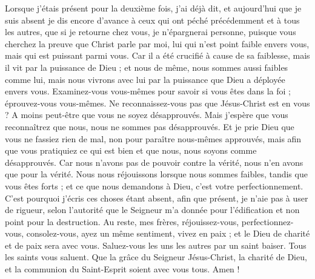 \begin{multicols}{2}
Lorsque j’étais présent pour la deuxième fois, j’ai déjà dit, et aujourd’hui que je suis absent je dis encore d’avance à ceux qui ont péché précédemment et à tous les autres, que si je retourne chez vous, je n'épargnerai personne,
puisque vous cherchez la preuve que Christ parle par moi, lui qui n'est point faible envers vous, mais qui est puissant parmi vous.
Car il a été crucifié à cause de sa faiblesse, mais il vit par la puissance de Dieu ; et nous de même, nous sommes aussi faibles comme lui, mais nous vivrons avec lui par la puissance que Dieu a déployée envers vous.
Examinez-vous vous-mêmes pour savoir si vous êtes dans la foi ; éprouvez-vous vous-mêmes. Ne reconnaissez-vous pas que Jésus-Christ est en vous ? A moins peut-être que vous ne soyez désapprouvés.
Mais j'espère que vous reconnaîtrez que nous, nous ne sommes pas désapprouvés.
Et je prie Dieu que vous ne fassiez rien de mal, non pour paraître nous-mêmes approuvés, mais afin que vous pratiquiez ce qui est bien et que nous, nous soyons comme désapprouvés.
Car nous n’avons pas de pouvoir contre la vérité, nous n’en avons que pour la vérité.
Nous nous réjouissons lorsque nous sommes faibles, tandis que vous êtes forts ; et ce que nous demandons à Dieu, c’est votre perfectionnement.
C'est pourquoi j'écris ces choses étant absent, afin que présent, je n’aie pas à user de rigueur, selon l’autorité que le Seigneur m'a donnée pour l'édification et non point pour la destruction.
\TextTitle{[Conclusion]}
Au reste, mes frères, réjouissez-vous, perfectionnez-vous, consolez-vous, ayez un même sentiment, vivez en paix ; et le Dieu de charité et de paix sera avec vous.
Saluez-vous les uns les autres par un saint baiser. Tous les saints vous saluent.
Que la grâce du Seigneur Jésus-Christ, la charité de Dieu, et la communion du Saint-Esprit soient avec vous tous. Amen !
\PPE{}
\end{multicols}
